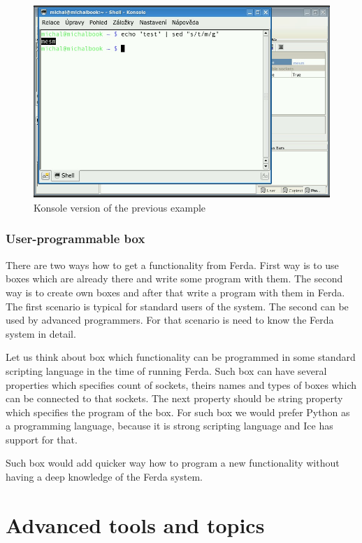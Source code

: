 \documentclass[a4paper,12pt]{book}
\begin{document}
\begin{figure}
	\includegraphics[width=1\textwidth]{command3.png}
	\caption{Konsole version of the previous example}
	\label{fig:CommandKonsole}
\end{figure}

\subsubsection{User-programmable box}
There are two ways how to get a functionality from Ferda. First way is to use boxes which are already there and write some program with them. The second way is to create own boxes and after that write a program with them in Ferda. The first scenario is typical for standard users of the system. The second can be used by advanced programmers. For that scenario is need to know the Ferda system in detail.

Let us think about box which functionality can be programmed in some standard scripting language in the time of running Ferda. Such box can have several properties which specifies count of sockets, theirs names and types of boxes which can be connected to that sockets. The next property should be string property which specifies the program of the box. For such box we would prefer Python as a programming language, because it is strong scripting language and Ice has support for that.

Such box would add quicker way how to program a new functionality without having a deep knowledge of the Ferda system. 

\section{Advanced tools and topics}
\end{document}
